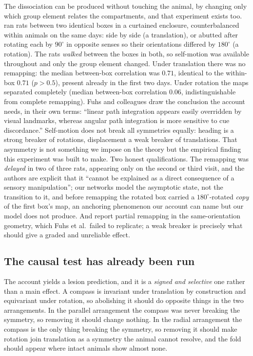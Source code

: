\documentclass[9pt,lineno]{elife}
\begin{document}
The dissociation can be produced without touching the animal, by changing only which group element
relates the compartments, and that experiment exists too. \citet{fuhs2005} ran rats between two
identical boxes in a curtained enclosure, counterbalanced within animals on the same days: side by side
(a translation), or abutted after rotating each by $90^\circ$ in opposite senses so their orientations
differed by $180^\circ$ (a rotation). The rats \emph{walked} between the boxes in both, so self-motion
was available throughout and only the group element changed. Under translation there was no remapping:
the median between-box correlation was $0.71$, identical to the within-box $0.71$ ($p > 0.5$), present
already in the first two days. Under rotation the maps separated completely (median between-box
correlation $0.06$, indistinguishable from complete remapping). Fuhs and colleagues draw the conclusion
the account needs, in their own terms: ``linear path integration appears easily overridden by visual
landmarks, whereas angular path integration is more sensitive to cue discordance.'' Self-motion does
not break all symmetries equally: heading is a strong breaker of rotations, displacement a weak breaker
of translations. That asymmetry is not something we impose on the theory but the empirical finding this
experiment was built to make. Two honest qualifications. The remapping was
\emph{delayed} in two of three rats, appearing only on the second or third visit, and the authors are
explicit that it ``cannot be explained as a direct consequence of a sensory manipulation''; our networks
model the asymptotic state, not the transition to it, and before remapping the rotated box carried a
$180^\circ$-rotated \emph{copy} of the first box's map, an anchoring phenomenon our account can name
but our model does not produce. And \citet{skaggs1998} report partial remapping in the same-orientation
geometry, which Fuhs et al.\ failed to replicate; a weak breaker is precisely what should give a graded
and unreliable effect.

\subsection*{The causal test has already been run}

The account yields a lesion prediction, and it is a \emph{signed and selective} one rather than a main
effect. A compass is invariant under translation by construction and equivariant under rotation, so
abolishing it should do opposite things in the two arrangements. In the parallel arrangement the compass
was never breaking the symmetry, so removing it should change nothing. In the radial arrangement the
compass is the only thing breaking the symmetry, so removing it should make rotation join translation as
a symmetry the animal cannot resolve, and the fold should appear where intact animals show almost none.
\end{document}
